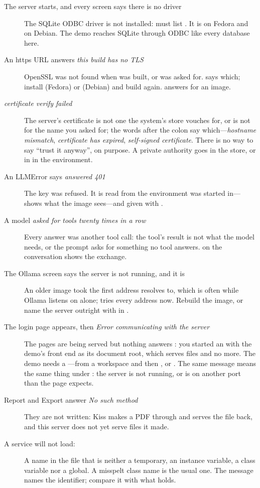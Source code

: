 \begin{description}
\item[The server starts, and every screen says there is no driver] The
  SQLite ODBC driver is not installed:  must list
  \ct{[SQLITE3]}. It is  on Fedora and  on
  Debian. The demo reaches SQLite through ODBC like every database here.
\item[An https URL answers \emph{this build has no TLS}] OpenSSL was not
  found when  was built, or  was asked for. 
  says which; install  (Fedora) or 
  (Debian) and build again.  answers for an image.
\item[\emph{certificate verify failed}] The server's certificate is not one
  the system's store vouches for, or is not for the name you asked for; the
  words after the colon say which---\emph{hostname mismatch},
  \emph{certificate has expired}, \emph{self-signed certificate}. There is no
  way to say ``trust it anyway'', on purpose. A private authority goes in
  the store, or in  in the environment.
\item[An LLMError says \emph{answered 401}] The key was refused. It is read
  from the environment  was started in---
  shows what the image sees---and given with .
\item[A model \emph{asked for tools twenty times in a row}] Every answer was
  another tool call: the tool's result is not what the model needs, or the
  prompt asks for something no tool answers.  on the
  conversation shows the exchange.
\item[The Ollama screen says the server is not running, and it is] An
  older image took the first address  resolves to, which is
  often  while Ollama listens on  alone;
   tries every address now. Rebuild the image, or name
  the server outright with  in .
\item[The login page appears, then \emph{Error communicating with the server}]
  The pages are being served but nothing answers : you started
  an  with the demo's front end as its document root, which
  serves files and no more. The demo needs a ---from a
  workspace 
  and then , or
  . The same
  message means the same thing under : the server is not
  running, or is on another port than the page expects.
\item[Report and Export answer \emph{No such method}] They are not
  written: Kiss makes a PDF through  and serves the file back,
  and this server does not yet serve files it made.
\item[A service will not load: ] A name in the
  file that is neither a temporary, an instance variable, a class variable
  nor a global. A misspelt class name is the usual one. The message names
  the identifier; compare it with what  holds.
\end{description}

